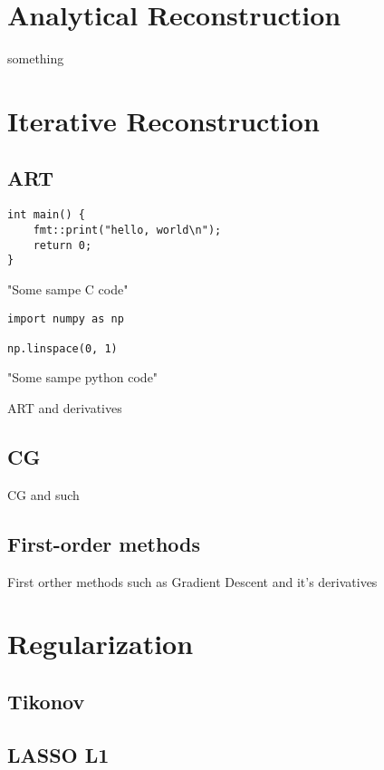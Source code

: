 \section{Analytical Reconstruction}
something

\section{Iterative Reconstruction}

\subsection{ART}

\begin{listing}
    \begin{verbatim}
int main() {
    fmt::print("hello, world\n");
    return 0;
}
    \end{verbatim}
    \caption{"Some sampe C code"}
\end{listing}
\begin{listing}
    \begin{verbatim}
import numpy as np

np.linspace(0, 1)
    \end{verbatim}
    \caption{"Some sampe python code"}
\end{listing}

ART and derivatives

\subsection{CG}

CG and such

\subsection{First-order methods}

First orther methods such as Gradient Descent and it's derivatives

\section{Regularization}

\subsection{Tikonov}

\subsection{LASSO L1}

